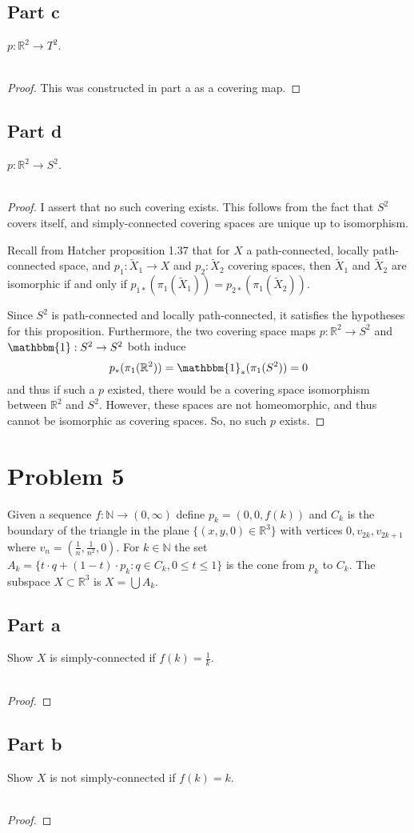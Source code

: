 \documentclass[fontsize=11pt]{scrartcl} %
\numberwithin{equation}{section} %
\numberwithin{figure}{section} %
\numberwithin{table}{section} %
\newcommand{\R}{\mathbb{R}}
\newcommand{\N}{\mathbb{N}}
\begin{document}
\subsection*{Part c}
$p:\R^2\to T^2$.
\\
\\
\begin{proof}
    This was constructed in part a as a covering map.
\end{proof}

\subsection*{Part d}
$p:\R^2\to S^2$.
\\
\\
\begin{proof}
    I assert that no such covering exists. This follows from the fact that $S^2$
    covers itself, and simply-connected covering spaces are unique up to
    isomorphism.

    Recall from Hatcher proposition 1.37 that for $X$ a
    path-connected, locally path-connected space, and $p_1:\tilde{X}_1\to X$ and
    $p_2:\tilde{X}_2$ covering spaces, then $\tilde{X}_1$ and $\tilde{X}_2$ are
    isomorphic if and only if $p_{1*}(\pi_1(\tilde{X}_1)) =
    p_{2*}(\pi_1(\tilde{X}_2))$.

    Since $S^2$ is path-connected and locally path-connected, it satisfies the
    hypotheses for this proposition. Furthermore, the two covering space maps
    $p:\R^2\to S^2$ and $\mathbbm{1}:S^2\to S^2$ both induce
    \[
        p_*(\pi_1(\R^2)) = \mathbbm{1}_*(\pi_1(S^2)) = 0
    \]
    and thus if such a $p$ existed, there would be a covering space isomorphism
    between $\R^2$ and $S^2$. However, these spaces are not homeomorphic, and
    thus cannot be isomorphic as covering spaces. So, no such $p$ exists.
\end{proof}

\newpage
\section*{Problem 5}
Given a sequence $f:\N\to(0, \infty)$ define $p_k = (0, 0, f(k))$ and $C_k$ is
the boundary of the triangle in the plane $\{(x, y, 0) \in \R^3\}$ with vertices
$0, v_{2k}, v_{2k+1}$ where $v_n = (\frac{1}{n}, \frac{1}{n^2},0)$.
For $k \in \N$ the set
$A_k = \{t\cdot q + (1 - t) \cdot p_k : q \in C_k, 0 \leq t \leq 1\}$
is the cone from $p_k$ to $C_k$. The subspace $X \subset \R^3$
is $X=\bigcup A_k$.

\subsection*{Part a}
Show $X$ is simply-connected if $f(k)=\frac{1}{k}$.
\\
\\
\begin{proof}
    
\end{proof}

\subsection*{Part b}
Show $X$ is not simply-connected if $f(k) = k$.
\\
\\
\begin{proof}
    
\end{proof}
\end{document}

